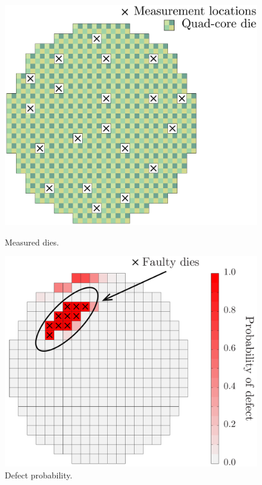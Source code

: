 \begin{figure}
\centering
\begin{minipage}{.49\linewidth}
  \centering
  \includegraphics[width=1\linewidth]{include/figures/wafer-measured.pdf}
  \caption{Measured dies.}
\end{minipage}
\begin{minipage}{.49\linewidth}
  \centering
  \includegraphics[width=1\linewidth]{include/figures/wafer-defective.pdf}
  \caption{Defect probability.}
\end{minipage}
\vspace{-1.5em}
\end{figure}
